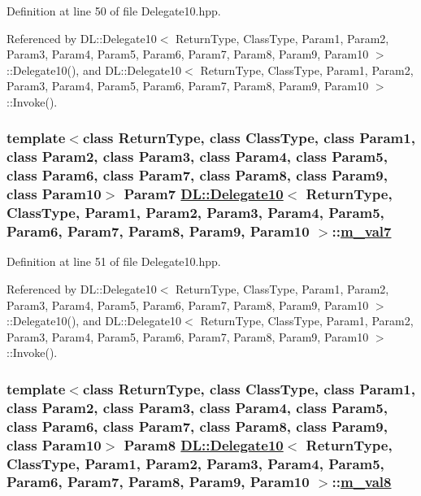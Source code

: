 Definition at line 50 of file Delegate10.hpp.

Referenced by DL::Delegate10$<$ Return\-Type, Class\-Type, Param1, Param2, Param3, Param4, Param5, Param6, Param7, Param8, Param9, Param10 $>$::Delegate10(), and DL::Delegate10$<$ Return\-Type, Class\-Type, Param1, Param2, Param3, Param4, Param5, Param6, Param7, Param8, Param9, Param10 $>$::Invoke().\hypertarget{classDL_1_1Delegate10_r8}{
\subsubsection[m\_\-val7]{\setlength{\rightskip}{0pt plus 5cm}template$<$class Return\-Type, class Class\-Type, class Param1, class Param2, class Param3, class Param4, class Param5, class Param6, class Param7, class Param8, class Param9, class Param10$>$ Param7 \hyperlink{classDL_1_1Delegate10}{DL::Delegate10}$<$ Return\-Type, Class\-Type, Param1, Param2, Param3, Param4, Param5, Param6, Param7, Param8, Param9, Param10 $>$::\hyperlink{classDL_1_1Delegate10_r8}{m\_\-val7}}}
\label{classDL_1_1Delegate10_r8}




Definition at line 51 of file Delegate10.hpp.

Referenced by DL::Delegate10$<$ Return\-Type, Class\-Type, Param1, Param2, Param3, Param4, Param5, Param6, Param7, Param8, Param9, Param10 $>$::Delegate10(), and DL::Delegate10$<$ Return\-Type, Class\-Type, Param1, Param2, Param3, Param4, Param5, Param6, Param7, Param8, Param9, Param10 $>$::Invoke().\hypertarget{classDL_1_1Delegate10_r9}{
\subsubsection[m\_\-val8]{\setlength{\rightskip}{0pt plus 5cm}template$<$class Return\-Type, class Class\-Type, class Param1, class Param2, class Param3, class Param4, class Param5, class Param6, class Param7, class Param8, class Param9, class Param10$>$ Param8 \hyperlink{classDL_1_1Delegate10}{DL::Delegate10}$<$ Return\-Type, Class\-Type, Param1, Param2, Param3, Param4, Param5, Param6, Param7, Param8, Param9, Param10 $>$::\hyperlink{classDL_1_1Delegate10_r9}{m\_\-val8}}}
\label{classDL_1_1Delegate10_r9}




